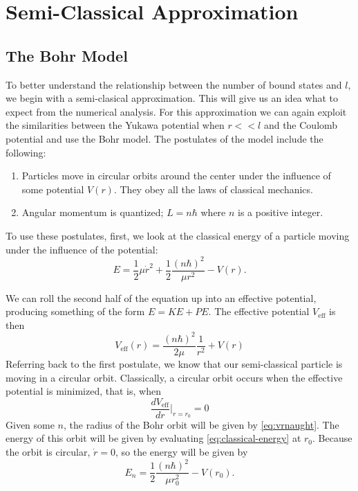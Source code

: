 \documentclass[12pt,twoside]{reedthesis}
\newcommand{\eqn}[1]{\begin{equation}#1\end{equation}}
\begin{document}
\chapter{Semi-Classical Approximation}
\section{The Bohr Model}
To better understand the relationship between the number of bound states and $l$, we begin with a semi-clasical approximation. This will give us an idea what to expect from the numerical analysis. For this approximation we can again exploit the similarities between the Yukawa potential when $r << l$ and the Coulomb potential and use the Bohr model. 
The postulates of the model include the following:
\begin{enumerate}
\item Particles move in circular orbits around the center under the influence of some potential $V(r)$. They obey all the laws of classical mechanics.
\item Angular momentum is quantized; $L = n\hbar$ where $n$ is a positive integer.
\end{enumerate}

To use these postulates, first, we look at the classical energy of a particle moving under the influence of the potential:
\eqn{
E = \frac{1}{2}\mu \dot{r}^2+\frac{1}{2}\frac{(n \hbar)^2}{\mu r^2}-V(r)\mbox{.}
\label{eq:classical-energy}
}

We can roll the second half of the equation up into an effective potential, producing something of the form $E = KE + PE$. The effective potential $V_{\mathrm{eff}}$ is then
\eqn{
V_{\mathrm{eff}}(r)=\frac{(n \hbar)^2}{2 \mu}\frac{1}{r^2}+V(r)
\label{eq:veff}
}
Referring back to the first postulate, we know that our semi-classical particle is moving in a circular orbit. Classically, a circular orbit occurs when the effective potential is minimized, that is, when
\eqn{
\frac{dV_{\mathrm{eff}}}{d r}\Big |_{r = r_0}= 0
\label{eq:vrnaught}
}
Given some $n$, the radius of the Bohr orbit will be given by \eqref{eq:vrnaught}. The energy of this orbit will be given by evaluating \eqref{eq:classical-energy}
 at $r_0$. Because the orbit is circular, $\dot{r} = 0$, so the energy will be given by
\eqn{
E_{n} = \frac{1}{2}\frac{(n\hbar)^2}{\mu r_0^2} - V(r_0)\mbox{.}
}
\end{document}
